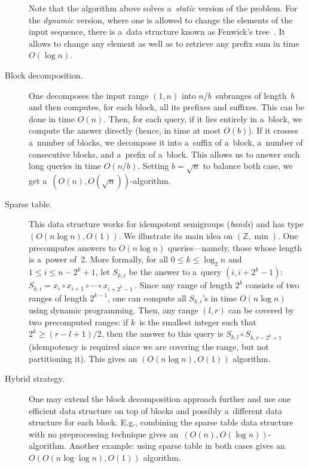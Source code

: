 \begin{description}
Note that the algorithm above solves a~{\em static} version of the problem. For the {\em dynamic} version, where one is allowed to change the elements of the input sequence, there is a~data structure known as Fenwick's tree~\cite{DBLP:journals/spe/Fenwick94}. It allows to change any element as well as to retrieve any prefix sum in time $O(\log n)$.

\item[Block decomposition.] One decomposes the input range $(1,n)$ into $n/b$~subranges of length~$b$ and then computes, for each block, all its prefixes and suffixes. This can be done in time $O(n)$. Then, for each query, if it lies entirely in a~block, we compute the answer directly (hence, in time at most $O(b)$). If it crosses a~number of blocks, we decompose it into a~suffix of a~block, a~number of consecutive blocks, and a~prefix of a~block. This allows us to answer such long queries in time $O(n/b)$. Setting $b=\sqrt{n}$ to balance both case, we get a~$(O(n), O(\sqrt{n}))$-algorithm. 

\item[Sparse table.] This data structure works for idempotent semigroups ({\em bands}) and has type $(O(n\log n), O(1))$. We illustrate its main idea on $(\mathbb{Z}, \min)$. One precomputes answers to $O(n\log n)$ queries---namely, those whose length is a~power of~2. More formally, for all $0 \le k \le \log_2n$ and $1 \le i \le n-2^k+1$, let $S_{k,i}$ be the answer to a~query $(i, i+2^k-1)$:
\(S_{k,i}=x_i \circ x_{i+1} \circ \dotsb \circ x_{i+2^k-1} \, .\)
Since any range of length $2^k$ consists of two ranges of length $2^{k-1}$, one can compute all $S_{k,i}$'s in time $O(n\log n)$ using dynamic programming. Then, any range $(l,r)$ can be covered by two precomputed ranges: if $k$~is the smallest integer such that $2^k \ge (r-l+1)/2$, then the answer to this query is $S_{k,l} \circ S_{k,r-2^k+1}$ (idempotency is required since we are covering the range, but not partitioning it). This gives an $(O(n\log n), O(1))$ algorithm.

\item[Hybrid strategy.] One may extend the block decomposition approach further and use one efficient data structure on top of blocks and possibly a~different data structure for each block. E.g., combining the sparse table data structure with no preprocessing technique gives an~$(O(n), O(\log n))$-algorithm. Another example: using sparse table in both cases gives an $O(O(n\log\log n), O(1))$ algorithm. 



\end{description}
